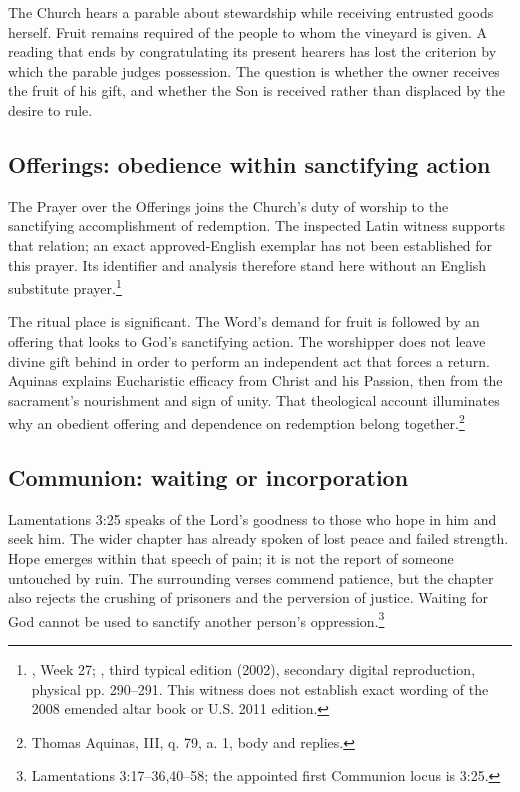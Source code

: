The Church hears a parable about stewardship while receiving entrusted goods herself. Fruit remains required of the people to whom the vineyard is given. A reading that ends by congratulating its present hearers has lost the criterion by which the parable judges possession. The question is whether the owner receives the fruit of his gift, and whether the Son is received rather than displaced by the desire to rule.

\subsection{Offerings: obedience within sanctifying action}
The Prayer over the Offerings joins the Church's duty of worship to the sanctifying accomplishment of redemption. The inspected Latin witness supports that relation; an exact approved-English exemplar has not been established for this prayer. Its identifier and analysis therefore stand here without an English substitute prayer.\footnote{, Week 27; , third typical edition (2002), secondary digital reproduction, physical pp. 290--291. This witness does not establish exact wording of the 2008 emended altar book or U.S. 2011 edition.}

The ritual place is significant. The Word's demand for fruit is followed by an offering that looks to God's sanctifying action. The worshipper does not leave divine gift behind in order to perform an independent act that forces a return. Aquinas explains Eucharistic efficacy from Christ and his Passion, then from the sacrament's nourishment and sign of unity. That theological account illuminates why an obedient offering and dependence on redemption belong together.\footnote{Thomas Aquinas,  III, q. 79, a. 1, body and replies.}

\subsection{Communion: waiting or incorporation}
Lamentations 3:25 speaks of the Lord's goodness to those who hope in him and seek him. The wider chapter has already spoken of lost peace and failed strength. Hope emerges within that speech of pain; it is not the report of someone untouched by ruin. The surrounding verses commend patience, but the chapter also rejects the crushing of prisoners and the perversion of justice. Waiting for God cannot be used to sanctify another person's oppression.\footnote{Lamentations 3:17--36,40--58; the appointed first Communion locus is 3:25.}

